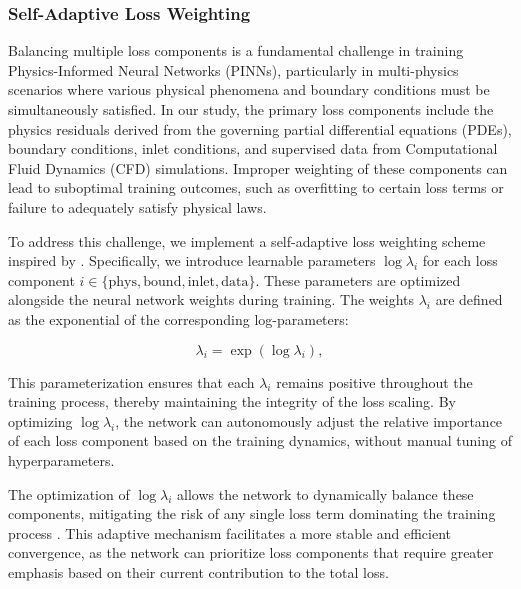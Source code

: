 \documentclass[12pt, a4paper]{article}
\begin{document}
\subsubsection{Self-Adaptive Loss Weighting}
\label{sec:self_adaptive_weighting}

Balancing multiple loss components is a fundamental challenge in training Physics-Informed Neural Networks (PINNs), particularly in multi-physics scenarios where various physical phenomena and boundary conditions must be simultaneously satisfied. In our study, the primary loss components include the physics residuals derived from the governing partial differential equations (PDEs), boundary conditions, inlet conditions, and supervised data from Computational Fluid Dynamics (CFD) simulations. Improper weighting of these components can lead to suboptimal training outcomes, such as overfitting to certain loss terms or failure to adequately satisfy physical laws.

To address this challenge, we implement a self-adaptive loss weighting scheme inspired by \citet{mcclenny2020self}. Specifically, we introduce learnable parameters $\log \lambda_i$ for each loss component $i \in \{\mathrm{phys}, \mathrm{bound}, \mathrm{inlet}, \mathrm{data}\}$. These parameters are optimized alongside the neural network weights during training. The weights $\lambda_i$ are defined as the exponential of the corresponding log-parameters:

\begin{equation}
    \lambda_i = \exp(\log \lambda_i),
    \label{eq:lambda_definition}
\end{equation}

This parameterization ensures that each $\lambda_i$ remains positive throughout the training process, thereby maintaining the integrity of the loss scaling. By optimizing $\log \lambda_i$, the network can autonomously adjust the relative importance of each loss component based on the training dynamics, without manual tuning of hyperparameters. 

The optimization of $\log \lambda_i$ allows the network to dynamically balance these components, mitigating the risk of any single loss term dominating the training process \citep{wang2022and}. This adaptive mechanism facilitates a more stable and efficient convergence, as the network can prioritize loss components that require greater emphasis based on their current contribution to the total loss.
\end{document}
